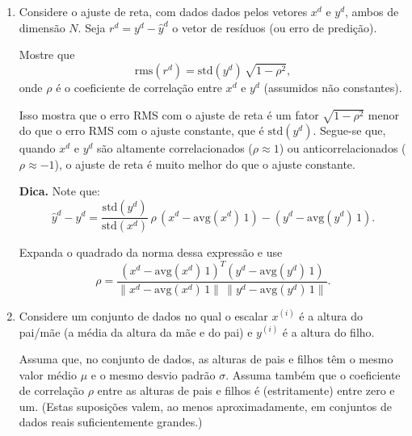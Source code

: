 \documentclass[a4paper,12pt]{article}
\begin{document}
\begin{enumerate}





\item Considere o ajuste de reta, com dados dados pelos vetores $ x^d $ e $ y^d $, ambos de dimensão $N$. Seja $ r^d = y^d - \hat{y}^d $ o vetor de resíduos (ou erro de predição).  

Mostre que
\[
\mathrm{rms}(r^d) = \mathrm{std}(y^d)\, \sqrt{1 - \rho^2},
\]
onde $\rho$ é o coeficiente de correlação entre $x^d$ e $y^d$ (assumidos não constantes).  

Isso mostra que o erro RMS com o ajuste de reta é um fator $\sqrt{1 - \rho^2}$ menor do que o erro RMS com o ajuste constante, que é $\mathrm{std}(y^d)$.  
Segue-se que, quando $x^d$ e $y^d$ são altamente correlacionados ($\rho \approx 1$) ou anticorrelacionados ($\rho \approx -1$), o ajuste de reta é muito melhor do que o ajuste constante.

\medskip
\noindent\textbf{Dica.}  
Note que:
\[
\hat{y}^d - y^d
= \frac{\mathrm{std}(y^d)}{\mathrm{std}(x^d)}
\, \rho \, (x^d - \mathrm{avg}(x^d)\,1)
 - (y^d - \mathrm{avg}(y^d)\,1).
\]

Expanda o quadrado da norma dessa expressão e use
\[
\rho
= \frac{(x^d - \mathrm{avg}(x^d)\,1)^T (y^d - \mathrm{avg}(y^d)\,1)}
       {\|x^d - \mathrm{avg}(x^d)\,1\|\, \|y^d - \mathrm{avg}(y^d)\,1\|}.
\]

\item Considere um conjunto de dados no qual o escalar $x^{(i)}$ é a altura do pai/mãe  
(a média da altura da mãe e do pai) e $y^{(i)}$ é a altura do filho.  

Assuma que, no conjunto de dados, as alturas de pais e filhos têm o mesmo valor médio $\mu$  
e o mesmo desvio padrão $\sigma$.  
Assuma também que o coeficiente de correlação $\rho$ entre as alturas de pais e filhos é (estritamente) entre zero e um.  
(Estas suposições valem, ao menos aproximadamente, em conjuntos de dados reais suficientemente grandes.)


\end{enumerate}
\end{document}
